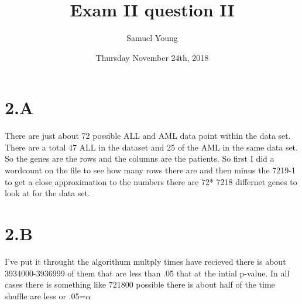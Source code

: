 \documentclass[12pt]{article}
\author{Samuel Young}
\title{Exam II question II}
\date{Thursday November 24th, 2018}
\begin{document}
\maketitle

\part{2.A}
   There are just about 72 possible ALL and AML data point within the data set. There are a total 47 ALL in the dataset and 25 of the AML in the same data set. So the genes are the rows and the columns are the patients. So first I did a wordcount on the file to see how many rows there are and then minus the 7219-1 to get a close approximation to the numbers there are 72* 7218 differnet genes to look at for the data set.
 
  \part{2.B}
   I've  put it throught the algorithum multply times have recieved there is about 3934000-3936999 of them that are less than .05 that at the intial p-value. In all cases there is something like 721800 possible there is about half of the time shuffle are less or .05=$\alpha$ 
                 
\end{document}
